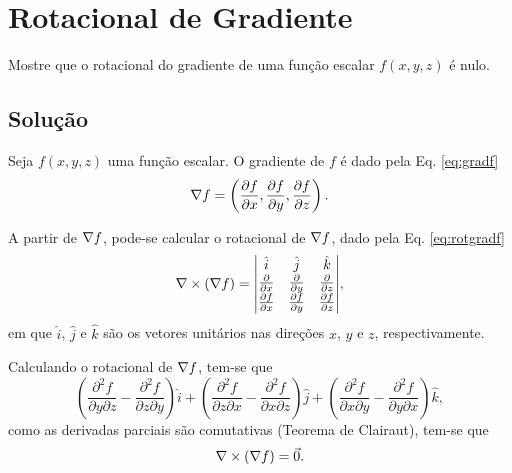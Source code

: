 \section{Rotacional de Gradiente} \label{sec:ex1}
Mostre que o rotacional do gradiente de uma fun\c{c}\~ao escalar  $f(x,y,z)$ \'e nulo.

\subsection{Solu\c{c}\~ao}
Seja $f(x,y,z)$ uma fun\c{c}\~ao escalar. O gradiente de $f$ \'e dado pela Eq. \eqref{eq:gradf}
\begin{equation}
    \label{eq:gradf}
    \nabla f = \left( \frac{\partial f}{\partial x}, \frac{\partial f}{\partial y}, \frac{\partial f}{\partial z} \right).
\end{equation}

A partir de $\nabla f$, pode-se calcular o rotacional de $\nabla f$, dado pela Eq. \eqref{eq:rotgradf}
\begin{equation}
    \label{eq:rotgradf}
    \nabla \times (\nabla f) = 
    \begin{matrix}
        \begin{vmatrix}
            \hat{i} & \hat{j} & \hat{k} \\
            \frac{\partial}{\partial x} & \frac{\partial}{\partial y} & \frac{\partial}{\partial z} \\
            \frac{\partial f}{\partial x} & \frac{\partial f}{\partial y} & \frac{\partial f}{\partial z}
        \end{vmatrix}
    \end{matrix},        
\end{equation}
em que $\hat{i}$, $\hat{j}$ e $\hat{k}$ s\~ao os vetores unit\'arios nas dire\c{c}\~oes $x$, $y$ e $z$, respectivamente.

Calculando o rotacional de $\nabla f$, tem-se que
\begin{equation*}
    \left( \frac{\partial^2 f}{\partial y \partial z} - \frac{\partial^2 f}{\partial z \partial y} \right) \hat{i} + 
        \left( \frac{\partial^2 f}{\partial z \partial x} - \frac{\partial^2 f}{\partial x \partial z} \right) \hat{j} + 
        \left( \frac{\partial^2 f}{\partial x \partial y} - \frac{\partial^2 f}{\partial y \partial x} \right) \hat{k},
\end{equation*}
como as derivadas parciais s\~ao comutativas (Teorema de Clairaut), tem-se que
\begin{equation*}
    \nabla \times (\nabla f) = \vec{0}.
\end{equation*}




